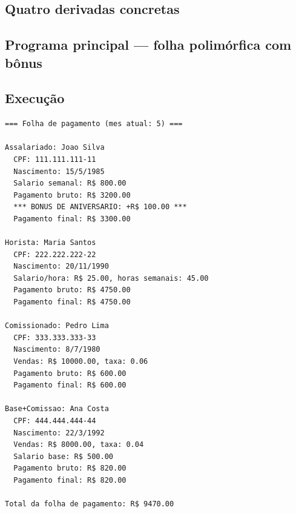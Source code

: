 \documentclass[11pt,a4paper]{article}
\begin{document}
\subsection*{Quatro derivadas concretas}













\subsection*{Programa principal --- folha polim\'orfica com b\^onus}



\subsection*{Execu\c{c}\~ao}

\begin{saidabox}
\begin{lstlisting}[style=terminal]
=== Folha de pagamento (mes atual: 5) ===

Assalariado: Joao Silva
  CPF: 111.111.111-11
  Nascimento: 15/5/1985
  Salario semanal: R$ 800.00
  Pagamento bruto: R$ 3200.00
  *** BONUS DE ANIVERSARIO: +R$ 100.00 ***
  Pagamento final: R$ 3300.00

Horista: Maria Santos
  CPF: 222.222.222-22
  Nascimento: 20/11/1990
  Salario/hora: R$ 25.00, horas semanais: 45.00
  Pagamento bruto: R$ 4750.00
  Pagamento final: R$ 4750.00

Comissionado: Pedro Lima
  CPF: 333.333.333-33
  Nascimento: 8/7/1980
  Vendas: R$ 10000.00, taxa: 0.06
  Pagamento bruto: R$ 600.00
  Pagamento final: R$ 600.00

Base+Comissao: Ana Costa
  CPF: 444.444.444-44
  Nascimento: 22/3/1992
  Vendas: R$ 8000.00, taxa: 0.04
  Salario base: R$ 500.00
  Pagamento bruto: R$ 820.00
  Pagamento final: R$ 820.00

Total da folha de pagamento: R$ 9470.00
\end{lstlisting}
\end{saidabox}
\end{document}
